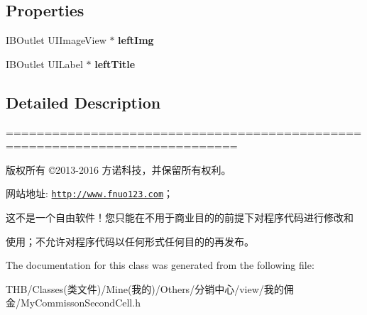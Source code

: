 \subsection*{Properties}
\begin{DoxyCompactItemize}
\item 
\mbox{\label{interface_my_commisson_second_cell_a200708841ba1643b9a5329173b5c478c}} 
I\+B\+Outlet U\+I\+Image\+View $\ast$ {\bfseries left\+Img}
\item 
\mbox{\label{interface_my_commisson_second_cell_a586076050ca5474a912a92306743e993}} 
I\+B\+Outlet U\+I\+Label $\ast$ {\bfseries left\+Title}
\end{DoxyCompactItemize}


\subsection{Detailed Description}
============================================================================

版权所有 ©2013-\/2016 方诺科技，并保留所有权利。

网站地址\+: \href{http://www.fnuo123.com}{\tt http\+://www.\+fnuo123.\+com}； 



这不是一个自由软件！您只能在不用于商业目的的前提下对程序代码进行修改和

使用；不允许对程序代码以任何形式任何目的的再发布。 

 

The documentation for this class was generated from the following file\+:\begin{DoxyCompactItemize}
\item 
T\+H\+B/\+Classes(类文件)/\+Mine(我的)/\+Others/分销中心/view/我的佣金/My\+Commisson\+Second\+Cell.\+h\end{DoxyCompactItemize}
